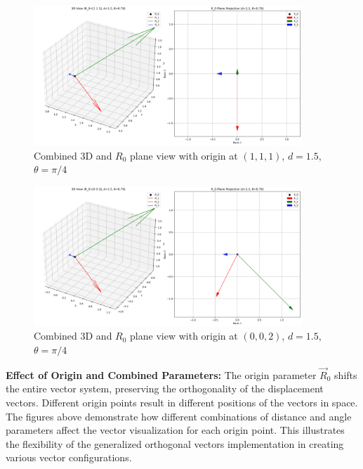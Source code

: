 \begin{figure}[H]
    \centering
    \includegraphics[width=0.9\textwidth]{figures/combined_view_R0_1_1_1_d_1p5_theta_0p79.png}
    \caption{Combined 3D and $R_0$ plane view with origin at $(1,1,1)$, $d=1.5$, $\theta=\pi/4$}
    \label{fig:example_combined_view_custom1}
\end{figure}

\begin{figure}[H]
    \centering
    \includegraphics[width=0.9\textwidth]{figures/combined_view_R0_0_0_2_d_1p5_theta_0p79.png}
    \caption{Combined 3D and $R_0$ plane view with origin at $(0,0,2)$, $d=1.5$, $\theta=\pi/4$}
    \label{fig:example_combined_view_custom2}
\end{figure}

\textbf{Effect of Origin and Combined Parameters:} The origin parameter $\vec{R}_0$ shifts the entire vector system, preserving the orthogonality of the displacement vectors. Different origin points result in different positions of the vectors in space. The figures above demonstrate how different combinations of distance and angle parameters affect the vector visualization for each origin point. This illustrates the flexibility of the generalized orthogonal vectors implementation in creating various vector configurations.

